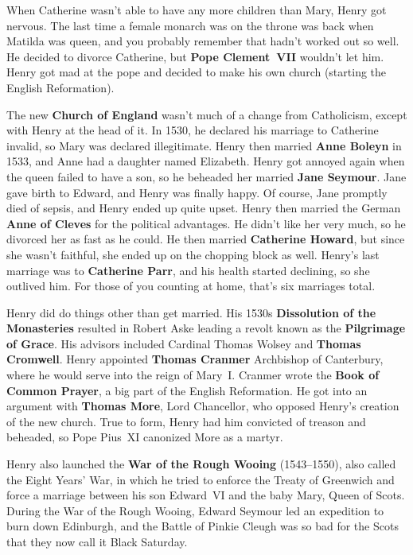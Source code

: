 When Catherine wasn't able to have any more children than Mary, Henry got nervous.
The last time a female monarch was on the throne was back when Matilda was queen,
and you probably remember that hadn't worked out so well.
He decided to divorce Catherine, but \textbf{Pope Clement~VII} wouldn't let him.
Henry got mad at the pope and decided to make his own church (starting the English Reformation).

The new \textbf{Church of England} wasn't much of a change from Catholicism, except with Henry at the head of it.
In 1530, he declared his marriage to Catherine invalid, so Mary was declared illegitimate.
Henry then married \textbf{Anne Boleyn} in 1533, and Anne had a daughter named Elizabeth.
Henry got annoyed again when the queen failed to have a son, so he beheaded her married \textbf{Jane Seymour}.
Jane gave birth to Edward, and Henry was finally happy.
Of course, Jane promptly died of sepsis, and Henry ended up quite upset.
Henry then married the German \textbf{Anne of Cleves} for the political advantages.
He didn't like her very much, so he divorced her as fast as he could.
He then married \textbf{Catherine Howard}, but since she wasn't faithful,
she ended up on the chopping block as well.
Henry's last marriage was to \textbf{Catherine Parr}, and his health started declining, so she outlived him.
For those of you counting at home, that's six marriages total.

Henry did do things other than get married.
His 1530s \textbf{Dissolution of the Monasteries} resulted in
Robert Aske leading a revolt known as the \textbf{Pilgrimage of Grace}.
His advisors included Cardinal Thomas Wolsey and \textbf{Thomas Cromwell}.
Henry appointed \textbf{Thomas Cranmer} Archbishop of Canterbury, where he would serve into the reign of Mary~I.
Cranmer wrote the \textbf{Book of Common Prayer}, a big part of the English Reformation.
He got into an argument with \textbf{Thomas More}, Lord Chancellor, who opposed Henry's creation of the new church.
True to form, Henry had him convicted of treason and beheaded, so Pope Pius~XI canonized More as a martyr.

Henry also launched the \textbf{War of the Rough Wooing} (1543--1550), also called the Eight Years' War,
in which he tried to enforce the Treaty of Greenwich
and force a marriage between his son Edward~VI and the baby Mary, Queen of Scots.
During the War of the Rough Wooing, Edward Seymour led an expedition to burn down Edinburgh,
and the Battle of Pinkie Cleugh was so bad for the Scots that they now call it Black Saturday.

